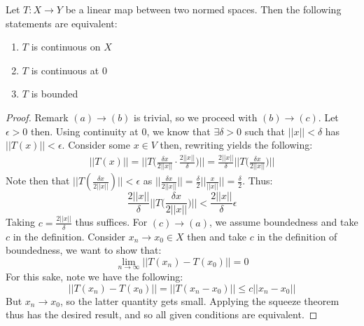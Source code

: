 \documentclass[12pt]{article}
\newcommand{\bignorm}{\Big | \Big |}
\newenvironment{theorem}[2][Theorem]{\begin{trivlist}
\item[\hskip \labelsep {\bfseries #1}\hskip \labelsep {\bfseries #2.}]}{\end{trivlist}}
\begin{document}
\begin{theorem}{(Continuity Conditions on Normed Spaces)}
    Let $T : X \rightarrow Y$ be a linear map between two normed spaces. Then the following statements are equivalent:
        \begin{enumerate}[label=(\alph*)]
            \item $T$ is continuous on $X$
            \item $T$ is continuous at $0$
            \item $T$ is bounded
        \end{enumerate}
        \begin{proof}
            Remark $(a) \rightarrow (b)$ is trivial, so we proceed with $(b) \rightarrow (c)$. Let $\epsilon > 0$ then. Using continuity at $0$, we know that $\exists \delta > 0$ such that $||x|| < \delta$ has $||T(x)|| < \epsilon$. Consider some $x \in V$ then, rewriting yields the following:
            \begin{equation}
                \begin{aligned}
                    ||T(x)|| = \bignorm T \Big ( \frac{\delta x}{2||x||} \cdot \frac{2||x||}{\delta} \Big ) \bignorm = \frac{2||x||}{\delta} \bignorm T\Big (\frac{\delta x}{2||x||} \Big) \bignorm
                \end{aligned}
            \end{equation}
            Note then that $\bignorm T(\frac{\delta x}{2||x||}) \bignorm < \epsilon$ as $\bignorm \frac{\delta x}{2||x||} \bignorm = \frac{\delta}{2} \bignorm \frac{x}{||x||} \bignorm = \frac{\delta}{2}$. Thus:
            \begin{equation}
                \frac{2||x||}{\delta} \bignorm T\Big (\frac{\delta x}{2||x||} \Big) \bignorm < \frac{2||x||}{\delta}\epsilon 
            \end{equation}
            Taking $c = \frac{2||x||}{\delta}$ thus suffices. For $(c) \rightarrow (a)$, we assume boundedness and take $c$ in the definition. Consider $x_n \rightarrow x_0 \in X$ then and take $c$ in the definition of boundedness, we want to show that: $$\underset{n \rightarrow \infty}{\lim} ||T(x_n) - T(x_0)|| = 0$$
            For this sake, note we have the following:
            $$ ||T(x_n) - T(x_0)|| = ||T(x_n - x_0)|| \leq c||x_n - x_0||$$
            But $x_n \rightarrow x_0$, so the latter quantity gets small. Applying the squeeze theorem thus has the desired result, and so all given conditions are equivalent.
        \end{proof}
\end{theorem}
\end{document}
